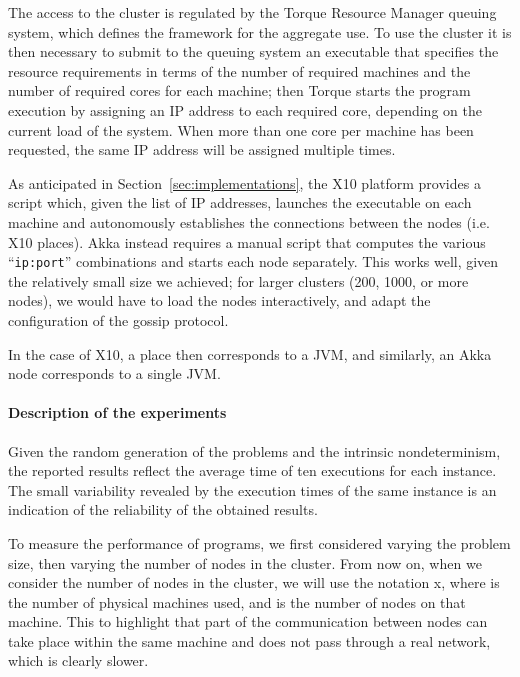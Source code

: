 \documentclass[a4paper]{article}
\numberwithin{equation}{section}
\begin{document}
{
\footnotesize

}

The access to the cluster is regulated by the Torque Resource Manager
queuing system, which defines the framework for the aggregate use.
To use the cluster it is then necessary to submit to the queuing
system an executable that specifies the resource requirements in terms
of the number of required machines and the number of required cores
for each machine; then Torque 
starts the program execution by assigning an IP address to each
required core, depending on the current load of the system. 
When more than one core per machine has been requested, 
the same IP address will be assigned multiple times.

As anticipated in Section~\ref{sec:implementations}, 
the X10 platform provides a script which, given the list of IP
addresses, launches the executable on 
each machine and autonomously establishes the connections
between the nodes (i.e. X10 places). Akka instead requires a manual
script that computes the various
``\verb+ip:port+'' combinations and starts each node separately.
This works
well, given the relatively small size we achieved; for larger clusters
(200, 1000, or more nodes), we would have to load the nodes
interactively, and adapt the configuration of the gossip protocol.

In the case of X10, a place then corresponds to a JVM, 
and similarly, an Akka node corresponds to a
single JVM. 







\paragraph{Description of the experiments}
Given the random generation of the problems and the intrinsic
nondeterminism, 
the reported results reflect the average time of ten executions
for each instance. The small variability revealed by the
execution times of the same instance is an indication of the
reliability of the obtained results. 

To measure the performance of programs, we first considered varying
the problem size, then varying the number of nodes in the cluster. 
From now on, when we consider the number of nodes in the cluster, we
will use the notation x, where  is the number of physical
machines used, and  is the number of nodes on that machine. 
This to highlight that part of the communication between nodes can
take place within the same machine and does not pass through a real
network, which is clearly slower.
\end{document}
